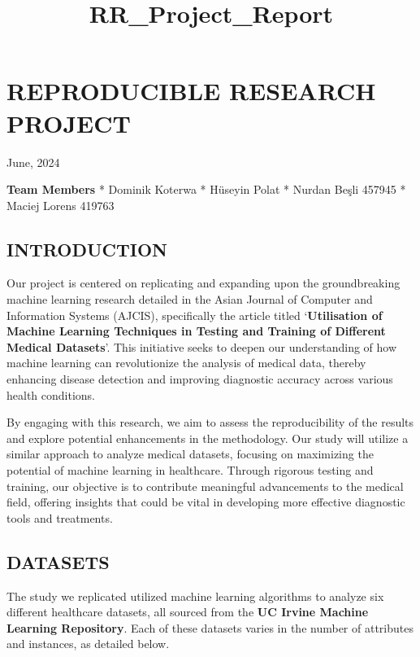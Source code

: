 \documentclass[11pt]{article}
\title{RR\_Project\_Report}
\begin{document}
    
    \maketitle
    
    

    
    \hypertarget{reproducible-research-project}{%
\section{REPRODUCIBLE RESEARCH
PROJECT}\label{reproducible-research-project}}

    June, 2024

    \textbf{Team Members} * Dominik Koterwa * Hüseyin Polat * Nurdan Beşli
457945 * Maciej Lorens 419763

    \hypertarget{introduction}{%
\subsection{INTRODUCTION}\label{introduction}}

    Our project is centered on replicating and expanding upon the
groundbreaking machine learning research detailed in the Asian Journal
of Computer and Information Systems (AJCIS), specifically the article
titled `\textbf{Utilisation of Machine Learning Techniques in Testing
and Training of Different Medical Datasets}'. This initiative seeks to
deepen our understanding of how machine learning can revolutionize the
analysis of medical data, thereby enhancing disease detection and
improving diagnostic accuracy across various health conditions.

By engaging with this research, we aim to assess the reproducibility of
the results and explore potential enhancements in the methodology. Our
study will utilize a similar approach to analyze medical datasets,
focusing on maximizing the potential of machine learning in healthcare.
Through rigorous testing and training, our objective is to contribute
meaningful advancements to the medical field, offering insights that
could be vital in developing more effective diagnostic tools and
treatments.

    \hypertarget{datasets}{%
\subsection{DATASETS}\label{datasets}}

    The study we replicated utilized machine learning algorithms to analyze
six different healthcare datasets, all sourced from the \textbf{UC
Irvine Machine Learning Repository}. Each of these datasets varies in
the number of attributes and instances, as detailed below.
\end{document}
